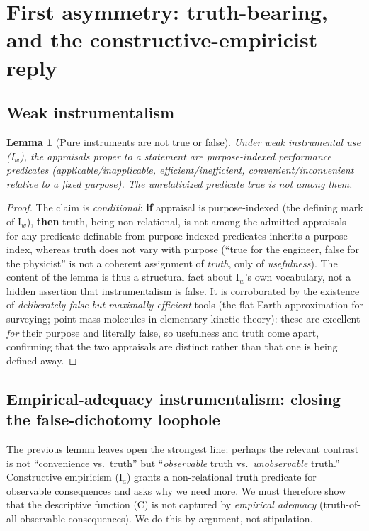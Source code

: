 \documentclass{amsart}
\theoremstyle{definition}
\theoremstyle{plain}
\newtheorem{lemma}{Lemma}
\begin{document}
\section{First asymmetry: truth-bearing, and the constructive-empiricist reply}

\subsection{Weak instrumentalism}

\begin{lemma}[Pure instruments are not true or false]\label{lem:instr-notrue}
Under weak instrumental use \textup{(I$_w$)}, the appraisals proper to a
statement are \emph{purpose-indexed} performance predicates
(applicable/inapplicable, efficient/inefficient, convenient/inconvenient
relative to a fixed purpose). The unrelativized predicate \emph{true} is not
among them.
\end{lemma}

\begin{proof}
The claim is \emph{conditional}: \textbf{if} appraisal is purpose-indexed (the
defining mark of $\mathrm I_w$), \textbf{then} truth, being non-relational,
is not among the admitted appraisals---for any predicate definable from
purpose-indexed predicates inherits a purpose-index, whereas truth does not
vary with purpose (``true for the engineer, false for the physicist'' is not a
coherent assignment of \emph{truth}, only of \emph{usefulness}). The content of
the lemma is thus a structural fact about $\mathrm I_w$'s own vocabulary, not a
hidden assertion that instrumentalism is false. It is corroborated by the
existence of \emph{deliberately false but maximally efficient} tools (the
flat-Earth approximation for surveying; point-mass molecules in elementary
kinetic theory): these are excellent \emph{for} their purpose and literally
false, so usefulness and truth come apart, confirming that the two appraisals
are distinct rather than that one is being defined away.
\end{proof}

\subsection{Empirical-adequacy instrumentalism: closing the false-dichotomy
loophole}

The previous lemma leaves open the strongest line: perhaps the relevant
contrast is not ``convenience vs.\ truth'' but ``\emph{observable} truth vs.\
\emph{unobservable} truth.'' Constructive empiricism ($\mathrm I_a$) grants a
non-relational truth predicate for observable consequences and asks why we need
more. We must therefore show that the descriptive function (C) is not captured
by \emph{empirical adequacy} (truth-of-all-observable-consequences). We do this
by argument, not stipulation.
\end{document}
